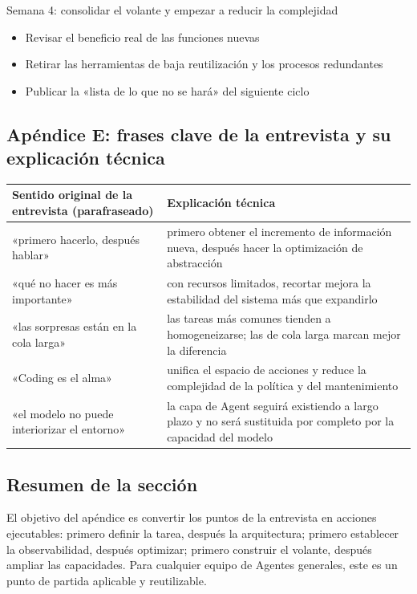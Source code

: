 \begin{knowledgebox}{Semana 4: consolidar el volante y empezar a reducir la complejidad}
\begin{itemize}
    \item Revisar el beneficio real de las funciones nuevas
    \item Retirar las herramientas de baja reutilización y los procesos redundantes
    \item Publicar la «lista de lo que no se hará» del siguiente ciclo
\end{itemize}
\end{knowledgebox}

\subsection{Apéndice E: frases clave de la entrevista y su explicación técnica}

\begin{center}
\begin{tabular}{p{5.4cm}p{7.2cm}}
\toprule
Sentido original de la entrevista (parafraseado) & Explicación técnica \\
\midrule
«primero hacerlo, después hablar» & primero obtener el incremento de información nueva, después hacer la optimización de abstracción \\
«qué no hacer es más importante» & con recursos limitados, recortar mejora la estabilidad del sistema más que expandirlo \\
«las sorpresas están en la cola larga» & las tareas más comunes tienden a homogeneizarse; las de cola larga marcan mejor la diferencia \\
«Coding es el alma» & unifica el espacio de acciones y reduce la complejidad de la política y del mantenimiento \\
«el modelo no puede interiorizar el entorno» & la capa de Agent seguirá existiendo a largo plazo y no será sustituida por completo por la capacidad del modelo \\
\bottomrule
\end{tabular}
\end{center}

\subsection{Resumen de la sección}

El objetivo del apéndice es convertir los puntos de la entrevista en acciones ejecutables: primero definir la tarea, después la arquitectura; primero establecer la observabilidad, después optimizar; primero construir el volante, después ampliar las capacidades. Para cualquier equipo de Agentes generales, este es un punto de partida aplicable y reutilizable.

